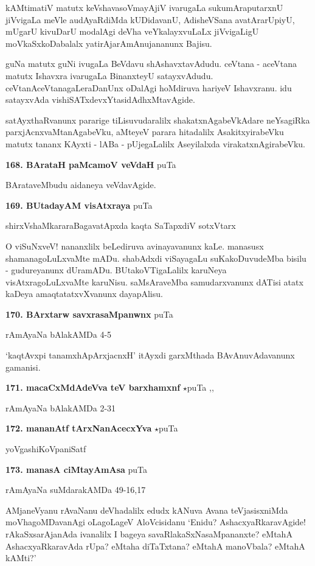 kAMtimatiV matutx keVshavasoVmayAjiV ivarugaLa sukumAraputarxnU jiVvigaLa meVle audAyaRdiMda kUDidavanU, AdisheVSana avatArarUpiyU, mUgarU kivuDarU modalAgi deVha veYkalayxvuLaLx jiVvigaLigU moVkaSxkoDabalalx yatirAjarAmAnujananunx Bajisu.

guNa matutx guNi ivugaLa BeVdavu shAshavxtavAdudu. ceVtana - aceVtana matutx Ishavxra ivarugaLa BinanxteyU satayxvAdudu. ceVtanAceVtanagaLeraDanUnx oDalAgi hoMdiruva hariyeV Ishavxranu. idu satayxvAda vishiSATxdevxYtasidAdhxMtavAgide.

satAyxthaRvanunx pararige tiLisuvudaralilx shakatxnAgabeVkAdare neYsagiRka parxjAcnxvaMtanAgabeVku, aMteyeV parara hitadalilx AsakitxyirabeVku matutx tananx KAyxti - lABa - pUjegaLalilx Aseyilalxda virakatxnAgirabeVku.

\medskip
\noindent\textbf{168. BArataH paMcamoV veVdaH} \hfill puTa \pageref{122}

BArataveMbudu aidaneya veVdavAgide.

\medskip
\noindent\textbf{169. BUtadayAM visAtxraya} \hfill puTa \pageref{115b}

\hfill shirxVshaMkararaBagavatApxda kaqta SaTapxdiV sotxVtarx

O viSuNxveV! nananxlilx beLediruva avinayavanunx kaLe. manasusx shamanagoLuLxvaMte mADu. shabAdxdi viSayagaLu suKakoDuvudeMba bisilu - gudureyanunx dUramADu. BUtakoVTigaLalilx karuNeya visAtxragoLuLxvaMte karuNisu. saMsAraveMba samudarxvanunx dATisi atatx kaDeya amaqtatatxvXvanunx dayapAlisu.

\medskip
\noindent\textbf{170. BArxtarw savxrasaMpanwnx} \hfill puTa \pageref{250b}

\hfill rAmAyaNa bAlakAMDa 4-5

`kaqtAvxpi tanamxhApArxjacnxH' itAyxdi garxMthada BAvAnuvAdavanunx gamanisi.

\medskip
\noindent\textbf{171. macaCxMdAdeVva teV barxhamxnf} $\star$\hfill puTa \pageref{21a},\pageref{203b},\pageref{250c}

\hfill rAmAyaNa bAlakAMDa 2-31

\medskip
\noindent\textbf{172. mananAtf tArxNanAcecxYva} $\star$\hfill puTa \pageref{10}

\hfill yoVgashiKoVpaniSatf

\medskip
\noindent\textbf{173. manasA ciMtayAmAsa} \hfill puTa \pageref{192}

\hfill rAmAyaNa suMdarakAMDa 49-16,17

AMjaneVyanu rAvaNanu deVhadalilx edudx kANuva Avana teVjasisxniMda moVhagoMDavanAgi oLagoLageV AloVcisidanu `Enidu? AshacxyaRkaravAgide! rAkaSxsarAjanAda ivanalilx I bageya savaRlakaSxNasaMpananxte? eMtahA AshacxyaRkaravAda rUpa? eMtaha diTaTxtana? eMtahA manoVbala? eMtahA kAMti?'

